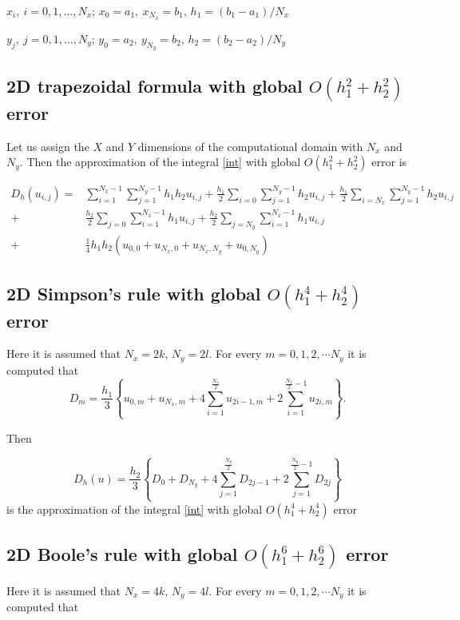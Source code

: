 \documentclass[%
 aip,
cp,  %
 amsmath,amssymb,%
 reprint,%
]{revtex4-2}
\begin{document}
$x_i, ~i=0,1,...,N_x$; $x_0=a_1,~x_{N_x}=b_1$, $h_1=(b_1-a_1)/N_x$


$y_j, ~j=0,1,...,N_y$; $y_0=a_2,~y_{N_y}=b_2$,  $h_2=(b_2-a_2)/N_y$

\subsection{ 2D trapezoidal formula with global $O(h_1^2+h_2^2)$ error }

Let us assign the $X$ and $Y$ dimensions of the computational domain with $N_x$ and $N_y$. Then the approximation of the integral \eqref{int} 
with global $O(h_1^2+h_2^2)$ error is

\begin{align}\label{quadr2}
D_h(u_{i,j}) =& \sum_{i=1}^{N_x-1} \sum_{j=1}^{N_y-1} h_1 h_2 u_{i,j}
+\frac{h_1}{2}\sum_{i=0} \sum_{j=1}^{N_y-1} h_2 u_{i,j}
+\frac{h_1}{2}\sum_{i=N_x} \sum_{j=1}^{N_y-1} h_2 u_{i,j} \nonumber\\
+&\frac{h_2}{2}\sum_{j=0} \sum_{i=1}^{N_x-1} h_1 u_{i,j}
+\frac{h_2}{2}\sum_{j=N_y} \sum_{i=1}^{N_x-1} h_1 u_{i,j}
\nonumber\\
+&\frac{1}{4}h_1 h_2 \left(u_{0,0}+u_{N_x,0}+u_{N_x,N_y}+u_{0,N_y}
\right)
\end{align}

\subsection{ 2D Simpson's rule with global $O(h_1^4+h_2^4)$ error}

Here it is assumed that $N_x=2k$, $N_y=2 l$. For every $m=0,1,2,\cdots N_y$ it is computed that 
$$D_m= \frac{h_1 }{3} 
\left\{ u_{0,m}+u_{N_x,m}+ 4 \sum_{i=1}^{\frac{N_x}{2}}   u_{2i-1,m}
 +2 \sum_{i=1}^{\frac{N_x}{2}-1} u_{2i,m} \right\}.$$


Then 

\begin{equation}\label{quadr4}
D_h(u)=\frac{h_2 }{3} 
\left\{ D_{0}+D_{N_y}+ 4 \sum_{j=1}^{\frac{N_y}{2}}   D_{2j-1}
 +2 \sum_{j=1}^{{\frac{N_y}{2}}-1} D_{2j} \right\}
\end{equation}
is the approximation of the integral \eqref{int} with global $O(h_1^4+h_2^4)$ error


\subsection{ 2D Boole's rule with global $O(h_1^6+h_2^6)$ error }
Here it is assumed that $N_x=4k$, $N_y=4 l$. For every $m=0,1,2,\cdots N_y$ it is computed that
\end{document}
